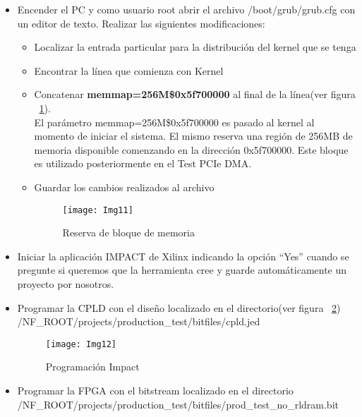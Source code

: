 \begin{itemize}
\item Encender el PC y como usuario root abrir el archivo /boot/grub/grub.cfg con un editor de texto. Realizar las siguientes modificaciones:

\begin{itemize}
\item Localizar la entrada particular para la distribución del kernel que se tenga
\item Encontrar la línea que comienza con Kernel
\item Concatenar \textbf{memmap=256M\$0x5f700000} al final de la línea(ver figura ~\ref{fig:Img11}).\\
El parámetro memmap=256M\$0x5f700000 es pasado al kernel al momento de iniciar el sistema. El mismo reserva una región de 256MB de memoria disponible comenzando en la dirección 0x5f700000. Este bloque es utilizado posteriormente en el Test PCIe DMA.
\item Guardar los cambios realizados al archivo

\newpage
\begin{figure}[htbp!] 
\centering    
\texttt{[image: Img11]}
\caption[Reserva de bloque de memoria]{Reserva de bloque de memoria}
\label{fig:Img11}
\end{figure}

\end{itemize}

\item Iniciar la aplicación IMPACT de Xilinx indicando la opción “Yes” cuando se pregunte si queremos que la herramienta cree y guarde automáticamente un proyecto por nosotros.

\item Programar la CPLD con el diseño localizado en el directorio(ver figura ~\ref{fig:Img12})\\ 
/NF\_ROOT/projects/production\_test/bitfiles/cpld.jed

\begin{figure}[htbp!] 
\centering    
\texttt{[image: Img12]}
\caption[Programación Impact]{Programación Impact}
\label{fig:Img12}
\end{figure}

\item Programar la FPGA con el bitstream localizado en el directorio\\
/NF\_ROOT/projects/production\_test/bitfiles/prod\_test\_no\_rldram.bit


\end{itemize}
